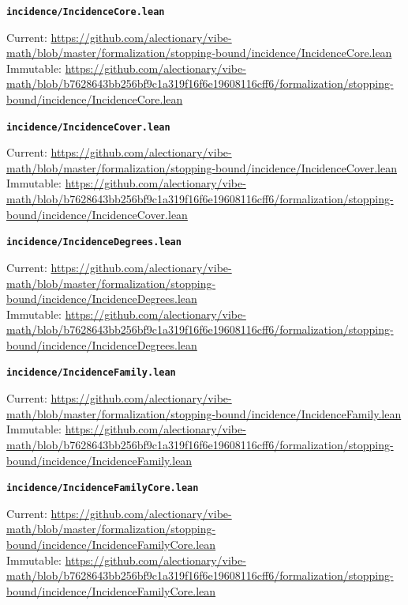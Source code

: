 \smallskip
\medskip
\par\noindent\textbf{\texttt{incidence/IncidenceCore.lean}}\par\nopagebreak
{\footnotesize\noindent Current: \url{https://github.com/alectionary/vibe-math/blob/master/formalization/stopping-bound/incidence/IncidenceCore.lean}\\
Immutable: \url{https://github.com/alectionary/vibe-math/blob/b7628643bb256bf9c1a319f16f6e19608116cff6/formalization/stopping-bound/incidence/IncidenceCore.lean}\par}
\smallskip
\medskip
\par\noindent\textbf{\texttt{incidence/IncidenceCover.lean}}\par\nopagebreak
{\footnotesize\noindent Current: \url{https://github.com/alectionary/vibe-math/blob/master/formalization/stopping-bound/incidence/IncidenceCover.lean}\\
Immutable: \url{https://github.com/alectionary/vibe-math/blob/b7628643bb256bf9c1a319f16f6e19608116cff6/formalization/stopping-bound/incidence/IncidenceCover.lean}\par}
\smallskip
\medskip
\par\noindent\textbf{\texttt{incidence/IncidenceDegrees.lean}}\par\nopagebreak
{\footnotesize\noindent Current: \url{https://github.com/alectionary/vibe-math/blob/master/formalization/stopping-bound/incidence/IncidenceDegrees.lean}\\
Immutable: \url{https://github.com/alectionary/vibe-math/blob/b7628643bb256bf9c1a319f16f6e19608116cff6/formalization/stopping-bound/incidence/IncidenceDegrees.lean}\par}
\smallskip
\medskip
\par\noindent\textbf{\texttt{incidence/IncidenceFamily.lean}}\par\nopagebreak
{\footnotesize\noindent Current: \url{https://github.com/alectionary/vibe-math/blob/master/formalization/stopping-bound/incidence/IncidenceFamily.lean}\\
Immutable: \url{https://github.com/alectionary/vibe-math/blob/b7628643bb256bf9c1a319f16f6e19608116cff6/formalization/stopping-bound/incidence/IncidenceFamily.lean}\par}
\smallskip
\medskip
\par\noindent\textbf{\texttt{incidence/IncidenceFamilyCore.lean}}\par\nopagebreak
{\footnotesize\noindent Current: \url{https://github.com/alectionary/vibe-math/blob/master/formalization/stopping-bound/incidence/IncidenceFamilyCore.lean}\\
Immutable: \url{https://github.com/alectionary/vibe-math/blob/b7628643bb256bf9c1a319f16f6e19608116cff6/formalization/stopping-bound/incidence/IncidenceFamilyCore.lean}\par}
